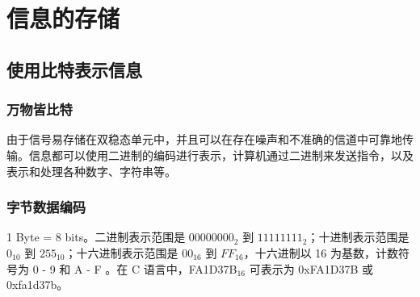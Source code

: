 \section{信息的存储}
\subsection{使用比特表示信息}
\subsubsection{万物皆比特}
由于信号易存储在双稳态单元中，并且可以在存在噪声和不准确的信道中可靠地传输。信息都可以使用二进制的编码进行表示，计算机通过二进制来发送指令，以及表示和处理各种数字、字符串等。

\subsubsection{字节数据编码}
1 Byte = 8 bits。二进制表示范围是 \(00000000_{2}\) 到 \(11111111_{2}\)；十进制表示范围是 \(0_{10}\) 到 \(255_{10}\)；十六进制表示范围是 \(00_{16}\) 到 \(FF_{16}\)，十六进制以 16 为基数，计数符号为 0 - 9 和 A - F 。在 C 语言中，FA1D37B$_{16}$ 可表示为 0xFA1D37B 或 0xfa1d37b。
